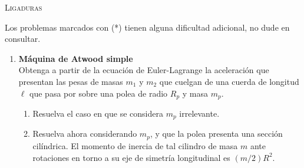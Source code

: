 \documentclass[11pt, spanish, a4paper, twoside]{article}
\begin{document}
\begin{center}
  \textsc{\large Ligaduras}
\end{center}

\noindent
Los problemas marcados con (*) tienen alguna dificultad adicional, no dude en consultar.

\begin{enumerate}

\item 
	\begin{minipage}[t][4.5cm]{0.7\textwidth}
		\textbf{Máquina de Atwood simple}\\
		Obtenga a partir de la ecuación de Euler-Lagrange la aceleración que presentan las pesas de masas \(m_1\) y \(m_2\) que cuelgan de una cuerda de longitud \(\ell\) que pasa por sobre una polea de radio \(R_p\) y masa \(m_p\).
		\begin{enumerate}
			\item Resuelva el caso en que se considera \(m_p\) irrelevante.
			\item Resuelva ahora considerando \(m_p\), y que la polea presenta una sección cilíndrica.
			El momento de inercia de tal cilindro de masa \(m\) ante rotaciones en torno a su eje de simetría longitudinal es \((m/2) R^2\).
		\end{enumerate}
	\end{minipage}
	\begin{minipage}[c][0cm][t]{0.2\textwidth}
		
	\end{minipage}


\end{enumerate}
\end{document}
